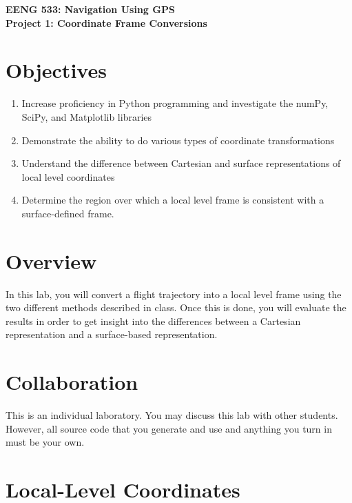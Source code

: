 \documentclass[12pt]{article}
\begin{document}
\begin{minipage}{0.9\textwidth}
   \raggedright
   \large \textbf{\textsf{{\color{gray}EENG 533: Navigation Using GPS} \\
      Project 1: Coordinate Frame Conversions}}
\end{minipage}
\vspace{1cm}

\section*{\textsf{Objectives}}

\begin{enumerate}
   \item Increase proficiency in Python programming and investigate the numPy, SciPy, and Matplotlib libraries
   \item Demonstrate the ability to do various types of coordinate
      transformations
   \item Understand the difference between Cartesian and surface representations
      of local level coordinates
   \item Determine the region over which a local level frame is consistent with
      a surface-defined frame.
\end{enumerate}

\section*{\textsf{Overview}}

In this lab, you will convert a flight trajectory into a local level frame using
the two different methods described in class.  Once this is done, you will
evaluate the results in order to get insight into the differences between a
Cartesian representation and a surface-based representation.

\section*{\textsf{Collaboration}}

This is an individual laboratory.  You may discuss this lab with other students.
However, all source code that you generate and use and anything you turn in must
be your own.

\section*{\textsf{Local-Level Coordinates}}
\end{document}
